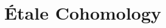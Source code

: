 \documentclass[11pt]{book}
\numberwithin{equation}{section}
\theoremstyle{plain} %
\theoremstyle{definition}
\begin{document}
\title{\'Etale Cohomology}

\maketitle

\tableofcontents
{}











\end{document}
